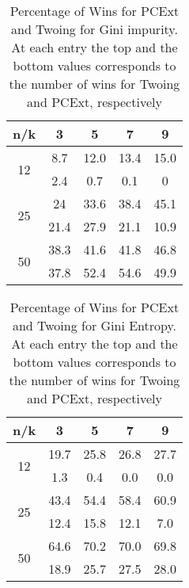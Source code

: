 \begin{table}[ht]
\caption{Percentage of Wins for PCExt and Twoing for Gini impurity. At each entry the top and the bottom values
corresponds to the number of wins for Twoing and PCExt, respectively}
\begin{center}
\begin{tabular}{c|c|c|c|c}
    
		n/k & 3 & 5 & 7 & 9 \\ \hline
    \multirow{2}{*}{12 }& 8.7 & 12.0  &  13.4 & 15.0  \\ &2.4 & 0.7 & 0.1 & 0 \\ \hline
		\multirow{2}{*}{25 }&  24 & 33.6 & 38.4 & 45.1 \\ & 21.4 & 27.9 & 21.1  & 10.9 \\ \hline
		\multirow{2}{*}{50 } & 38.3  & 41.6  &  41.8 & 46.8  \\ & 37.8 & 52.4 & 54.6  & 49.9 \\
		
		
		
    
\end{tabular}
\end{center}
\label{tab:Wins-Gini}
\end{table}

\begin{table}[ht]
\caption{Percentage of Wins for PCExt and Twoing for Gini Entropy. At each entry the top and the bottom values
corresponds to the number of wins for Twoing and PCExt, respectively}
\begin{center}
\begin{tabular}{c|c|c|c|c}
    
		 n/k & 3 & 5 & 7 & 9 \\ \hline
    \multirow{2}{*}{12 }& 19.7 & 25.8  &  26.8 & 27.7  \\ &1.3 & 0.4 & 0.0 & 0.0 \\ \hline
		\multirow{2}{*}{25 }&  43.4 & 54.4 & 58.4 & 60.9 \\ & 12.4 & 15.8 & 12.1  & 7.0 \\ \hline
		\multirow{2}{*}{50 } & 64.6  & 70.2  &  70.0 & 69.8  \\ & 18.9 & 25.7 & 27.5  & 28.0 \\
		
				
    
\end{tabular}
\end{center}
\label{tab:wins-entropy}
\end{table}


